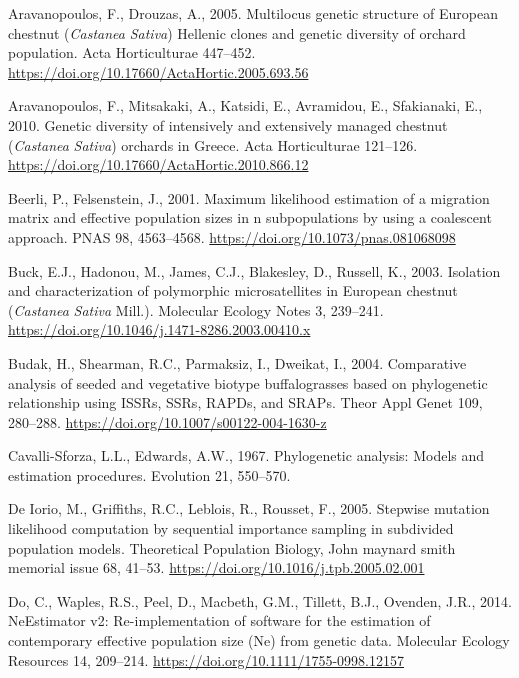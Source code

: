 \documentclass[12pt,a4paper,]{report}
\begin{document}
\leavevmode\hypertarget{ref-aravanopoulos_multilocus_2005}{}%
Aravanopoulos, F., Drouzas, A., 2005. Multilocus genetic structure of
European chestnut (\emph{Castanea} \emph{Sativa}) Hellenic clones and
genetic diversity of orchard population. Acta Horticulturae 447--452.
\url{https://doi.org/10.17660/ActaHortic.2005.693.56}

\leavevmode\hypertarget{ref-aravanopoulos_genetic_2010}{}%
Aravanopoulos, F., Mitsakaki, A., Katsidi, E., Avramidou, E.,
Sfakianaki, E., 2010. Genetic diversity of intensively and extensively
managed chestnut (\emph{Castanea} \emph{Sativa}) orchards in Greece.
Acta Horticulturae 121--126.
\url{https://doi.org/10.17660/ActaHortic.2010.866.12}

\leavevmode\hypertarget{ref-beerli_maximum_2001}{}%
Beerli, P., Felsenstein, J., 2001. Maximum likelihood estimation of a
migration matrix and effective population sizes in n subpopulations by
using a coalescent approach. PNAS 98, 4563--4568.
\url{https://doi.org/10.1073/pnas.081068098}

\leavevmode\hypertarget{ref-buck_isolation_2003}{}%
Buck, E.J., Hadonou, M., James, C.J., Blakesley, D., Russell, K., 2003.
Isolation and characterization of polymorphic microsatellites in
European chestnut (\emph{Castanea} \emph{Sativa} Mill.). Molecular
Ecology Notes 3, 239--241.
\url{https://doi.org/10.1046/j.1471-8286.2003.00410.x}

\leavevmode\hypertarget{ref-budak_comparative_2004}{}%
Budak, H., Shearman, R.C., Parmaksiz, I., Dweikat, I., 2004. Comparative
analysis of seeded and vegetative biotype buffalograsses based on
phylogenetic relationship using ISSRs, SSRs, RAPDs, and SRAPs. Theor
Appl Genet 109, 280--288.
\url{https://doi.org/10.1007/s00122-004-1630-z}

\leavevmode\hypertarget{ref-cavalli1967phylogenetic}{}%
Cavalli-Sforza, L.L., Edwards, A.W., 1967. Phylogenetic analysis: Models
and estimation procedures. Evolution 21, 550--570.

\leavevmode\hypertarget{ref-de_iorio_stepwise_2005}{}%
De Iorio, M., Griffiths, R.C., Leblois, R., Rousset, F., 2005. Stepwise
mutation likelihood computation by sequential importance sampling in
subdivided population models. Theoretical Population Biology, John
maynard smith memorial issue 68, 41--53.
\url{https://doi.org/10.1016/j.tpb.2005.02.001}

\leavevmode\hypertarget{ref-Do2014}{}%
Do, C., Waples, R.S., Peel, D., Macbeth, G.M., Tillett, B.J., Ovenden,
J.R., 2014. NeEstimator v2: Re-implementation of software for the
estimation of contemporary effective population size (Ne) from genetic
data. Molecular Ecology Resources 14, 209--214.
\url{https://doi.org/10.1111/1755-0998.12157}
\end{document}

